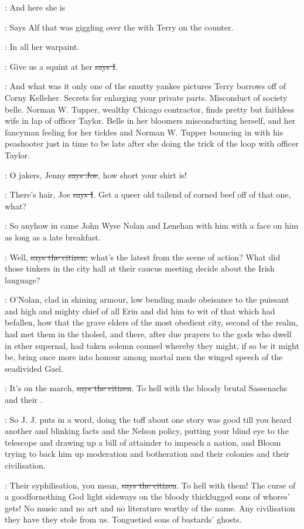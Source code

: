 \bergan:
And here she is

\Nq:
Says Alf that was giggling over the 
with Terry on the counter.

\bergan:
In all her warpaint.

:
Give us a squint at her \sout{says I}.

\Nq:
And what was it only one of the smutty yankee pictures Terry
borrows off of Corny Kelleher. Secrets for enlarging your private parts.
Misconduct of society belle. Norman W. Tupper, wealthy Chicago
contractor, finds pretty but faithless wife in lap of officer Taylor.
Belle in her bloomers misconducting herself, and her fancyman feeling for
her tickles and Norman W. Tupper bouncing in with his peashooter just in
time to be late after she doing the trick of the loop with officer Taylor.

\joe:
O jakers, Jenny \sout{says Joe},
how short your shirt is!

:
There's hair, Joe \sout{says I}.
Get a queer old tailend of corned beef off of
that one, what?

\Nq:
So anyhow in came John Wyse Nolan and Lenehan with him with a
face on him as long as a late breakfast.

\citizen:
Well, \sout{says the citizen,}
what's the latest from the scene of action? What
did those tinkers in the city hall at their caucus meeting decide about
the Irish language?

:
O'Nolan, clad in shining armour, low bending made obeisance to the
puissant and high and mighty chief of all Erin and did him to wit of that
which had befallen, how that the grave elders of the most obedient city,
second of the realm, had met them in the tholsel, and there, after due
prayers to the gods who dwell in ether supernal, had taken solemn counsel
whereby they might, if so be it might be, bring once more into honour
among mortal men the winged speech of the seadivided Gael.

\citizen:
It's on the march, \sout{says the citizen}.
To hell with the bloody brutal
Sassenachs and their .

\Nq:
So J. J. puts in a word, doing the toff about one story was good till
you heard another and blinking facts and the Nelson policy, putting your
blind eye to the telescope and drawing up a bill of attainder to impeach a
nation, and Bloom trying to back him up moderation and botheration and
their colonies and their civilisation.

\citizen:
Their syphilisation, you mean, \sout{says the citizen}.
To hell with them! The
curse of a goodfornothing God light sideways on the bloody thicklugged
sons of whores' gets! No music and no art and no literature worthy of the
name. Any civilisation they have they stole from us. Tonguetied sons of
bastards' ghosts.

